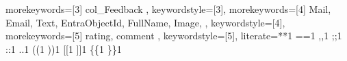 {    %
    morekeywords=[3]{
        col_Feedback
    }, keywordstyle=[3]\color{powerFxLightBlue},
    morekeywords=[4]{
        Mail,
        Email,
        Text,
        EntraObjectId,
        FullName,
        Image,
    }, keywordstyle=[4]\color{powerFxPurple},
    morekeywords=[5]{
        rating, 
        comment
    }, keywordstyle=[5]\color{powerFxDarkGrey},
    literate={*}{{\textcolor{powerFxPink}{*}}}{1}
        {=}{{\textcolor{black}{=}}}{1}
        {,}{{\textcolor{black}{,}}}{1}
        {;}{{\textcolor{black}{;}}}{1}
        {:}{{\textcolor{black}{:}}}{1}
        {.}{{\textcolor{black}{.}}}{1}
        {(}{{\textcolor{black}{(}}}{1}
        {)}{{\textcolor{black}{)}}}{1}
        {[}{{\textcolor{black}{[}}}{1}
        {]}{{\textcolor{black}{]}}}{1}
        {\{}{{\textcolor{black}{\{}}}{1}
        {\}}{{\textcolor{black}{\}}}}{1}
}